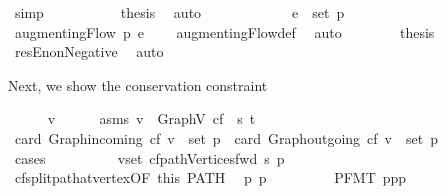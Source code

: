 \begin{isabellebody}
\ simp\ \isanewline
\ \ \ \ \ \ \isamarkupfalse%
\ \isamarkupfalse%
\ {\isacharquery}thesis\ \isamarkupfalse%
\ auto\isanewline
\ \ \ \ \isamarkupfalse%
\isanewline
\ \ \ \ \ \ \isamarkupfalse%
\ {\isachardoublequoteopen}e\ {\isasymnotin}\ set\ p{\isachardoublequoteclose}\isanewline
\ \ \ \ \ \ \isamarkupfalse%
\ {\isachardoublequoteopen}{\isacharparenleft}augmentingFlow\ p{\isacharparenright}\ e\ {\isacharequal}\ {}{\isachardoublequoteclose}\ \isamarkupfalse%
\ augmentingFlow{\isacharunderscore}def\ \isamarkupfalse%
\ auto\isanewline
\ \ \ \ \ \ \isamarkupfalse%
\ {\isacharquery}thesis\ \isamarkupfalse%
\ resE{\isacharunderscore}nonNegative\ \isamarkupfalse%
\ auto\isanewline
\ \ \ \ \isamarkupfalse%
\isanewline
\ \ \isacommand{{\isacharbraceright}}\isamarkupfalse%
\ \isanewline
\isanewline
\ \ \isacommand{{\isacharbraceleft}}\isamarkupfalse%
%
\begin{isamarkuptext}%
Next, we show the conservation constraint%
\end{isamarkuptext}\isamarkuptrue%
\ \ \ \ \isamarkupfalse%
\ v\isanewline
\ \ \ \ \isamarkupfalse%
\ asm{\isacharunderscore}s{\isacharcolon}\ {\isachardoublequoteopen}v\ {\isasymin}\ Graph{\isachardot}V\ cf\ {\isacharminus}\ {\isacharbraceleft}s{\isacharcomma}\ t{\isacharbraceright}{\isachardoublequoteclose}\isanewline
\isanewline
\ \ \ \ \isamarkupfalse%
\ {\isachardoublequoteopen}card\ {\isacharparenleft}Graph{\isachardot}incoming\ cf\ v\ {\isasyminter}\ set\ p{\isacharparenright}\ {\isacharequal}\ card\ {\isacharparenleft}Graph{\isachardot}outgoing\ cf\ v\ {\isasyminter}\ set\ p{\isacharparenright}{\isachardoublequoteclose}\isanewline
\ \ \ \ \isamarkupfalse%
\ {\isacharparenleft}cases{\isacharparenright}\ \ \isanewline
\ \ \ \ \ \ \isamarkupfalse%
\ {\isachardoublequoteopen}v{\isasymin}set\ {\isacharparenleft}cf{\isachardot}pathVertices{\isacharunderscore}fwd\ s\ p{\isacharparenright}{\isachardoublequoteclose}\isanewline
\ \ \ \ \ \ \isamarkupfalse%
\ cf{\isachardot}split{\isacharunderscore}path{\isacharunderscore}at{\isacharunderscore}vertex{\isacharbrackleft}OF\ this\ PATH{\isacharbrackright}\ \isamarkupfalse%
\ p{}\ p{}\ \isanewline
\ \ \ \ \ \ \ \ P{\isacharunderscore}FMT{\isacharcolon}\ {\isachardoublequoteopen}p{\isacharequal}p{}{\isacharat}p{}{\isachardoublequoteclose}\ \isanewline

\end{isabellebody}
